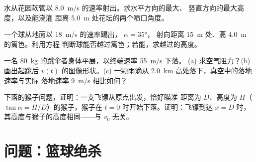 \begin{exercise}[$\star\star\star$]\label{exo:g12:projectile-motion:12}
水从花园软管以 \qty{8.0}{m/s} 的速率射出。求水平方向的最大、
竖直方向的最大高度，以及能浇灌
距离 \qty{5.0}{m} 处花坛的两个喷口角度。
\end{exercise}

\begin{exercise}[$\star\star\star$]\label{exo:g12:projectile-motion:13}
一个球从地面以 \qty{18}{m/s} 的速率踢出， $\alpha = \ang{35}$，
射向距离 \qty{15}{m} 处、高 \qty{4.0}{m} 的篱笆。利用方程
判断球能否越过篱笆；若能，求越过的高度。
\end{exercise}

\begin{exercise}[$\star\star\star$]\label{exo:g12:projectile-motion:14}
一名 \qty{80}{kg} 的跳伞者身体平展，以终端速率 \qty{55}{m/s} 下落。
(a) 求空气阻力？(b) 画出起跳后 $v(t)$ 的图像形状。(c) 一颗雨滴从
\qty{2.0}{km} 高处落下，真空中的落地速率与实际
落地速率 \qty{9}{m/s} 相比如何？
\end{exercise}

\begin{exercise}[$\star\star\star$]\label{exo:g12:projectile-motion:15}
下落的猴子问题，证明：一支飞镖从原点出发，恰好瞄准
距离为 $D$、高度为 $H$（$\tan\alpha = H/D$）的猴子，猴子在
$t = 0$ 时开始下落。证明：飞镖到达 $x = D$ 时，
其高度与猴子的高度相同——与 $v_0$ 无关。
\end{exercise}

\section{问题：篮球绝杀}

